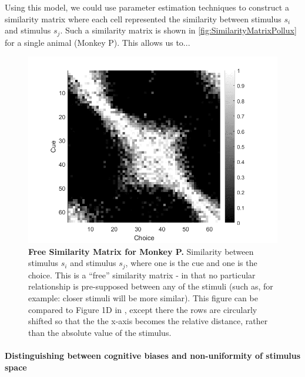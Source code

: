 Using this model, we could use parameter estimation techniques to construct a similarity matrix where each cell represented the similarity between stimulus $s_i$ and stimulus $s_j$. 
Such a similarity matrix is shown in \autoref{fig:SimilarityMatrixPollux} for a single animal (Monkey P).
This allows us to...

\begin{figure}
\includegraphics[width=\linewidth]{../../../Figures/working/SimilarityMatrixPollux.png}
\caption{\textbf{Free Similarity Matrix for Monkey P.}
Similarity between stimulus $s_i$ and stimulus $s_j$, where one is the cue and one is the choice. This is a ``free'' similarity matrix - in that no particular relationship is pre-supposed between any of the stimuli (such as, for example: closer stimuli will be more similar). This figure can be compared to Figure 1D in \cite{schurgin_psychophysical_2020}, except there the rows are circularly shifted so that the the x-axis becomes the relative distance, rather than the absolute value of the stimulus. %
} 
\label{fig:SimilarityMatrixPollux}
\end{figure}


\paragraph{Distinguishing between cognitive biases and non-uniformity of stimulus space}

